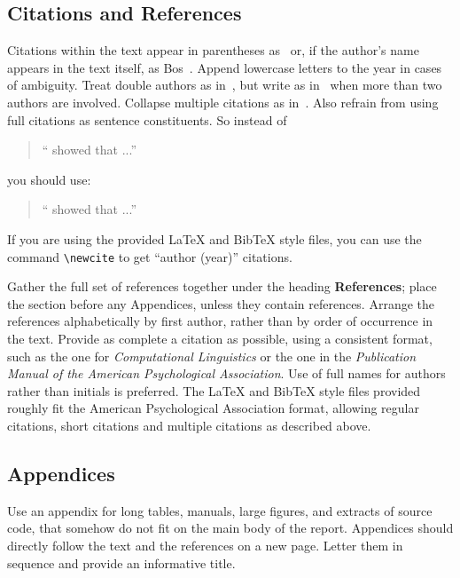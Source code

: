 \documentclass[11pt]{article}
\begin{document}
\subsection{Citations and References}

 Citations within the text appear in parentheses
as~\cite{Bos2015NoDaLiDa} or, if the author's name appears in the text
itself, as Bos~.  Append lowercase letters
to the year in cases of ambiguity.  Treat double authors as
in~\cite{BlackburnBos2005CSLI}, but write as in~\cite{monroe-goodman-potts:2016:EMNLP2016} when more than two
authors are involved. Collapse multiple citations as
in~\cite{BlackburnBos2005CSLI,Bos2015NoDaLiDa}. Also refrain from using full citations
as sentence constituents. So instead of
\begin{quote}
  ``\cite{Bos2015NoDaLiDa} showed that ...''
\end{quote}
you should use:
\begin{quote}
   ``   showed that ...''
\end{quote}

If you are using the provided \LaTeX{} and Bib\TeX{} style files, you
can use the command \verb|\newcite| to get ``author (year)'' citations.

Gather the full set of references together under
the heading {\bf References}; place the section before any Appendices,
unless they contain references. Arrange the references alphabetically
by first author, rather than by order of occurrence in the text.
Provide as complete a citation as possible, using a consistent format,
such as the one for {\em Computational Linguistics\/} or the one in the 
{\em Publication Manual of the American 
Psychological Association\/}.  Use of full names for
authors rather than initials is preferred.  
The \LaTeX{} and Bib\TeX{} style files provided roughly fit the
American Psychological Association format, allowing regular citations, 
short citations and multiple citations as described above.


\subsection{Appendices} 

Use an appendix for long tables, manuals, large figures, and extracts
of source code, that somehow do not fit on the main body of the
report.  Appendices should directly follow the text and the references
on a new page.  Letter them in sequence and provide an informative
title.






\onecolumn
\appendix

\end{document}
